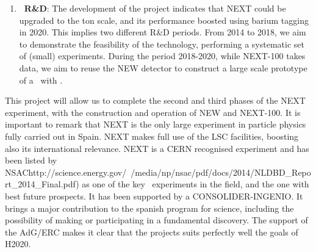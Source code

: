 \begin{enumerate}
\item {\bf \BATA\ R\&D}: The development of the project indicates that NEXT could be upgraded to the ton scale, and its performance boosted using barium tagging in 2020. This implies two different R\&D periods. From 2014 to 2018, we aim to demonstrate the feasibility of the technology, performing a systematic set of (small) experiments. During the period 2018-2020, while NEXT-100 takes data, we aim to reuse the NEW detector to construct a large scale prototype of a \HPXE\ with \BATA. 

\end{enumerate}

This project will allow us to complete the second and third phases of the NEXT experiment, with the construction and operation of NEW and NEXT-100.  It is important to remark that NEXT is the only large experiment in particle physics fully carried out in Spain. NEXT makes full use of the LSC facilities, boosting also its international relevance.  NEXT is a CERN recognised experiment and has been listed by NSAChttp://science.energy.gov/~/media/np/nsac/pdf/docs/2014/NLDBD\_Report\_2014\_Final.pdf) as one of the key \bbonu\ experiments in the field, and the one with best future prospects. It has been supported by a CONSOLIDER-INGENIO. It brings a major contribution to the spanish program for science, including the possibility of making or participating in a fundamental discovery. The support of the AdG/ERC makes it clear that the projects suits perfectly well the goals of H2020.
